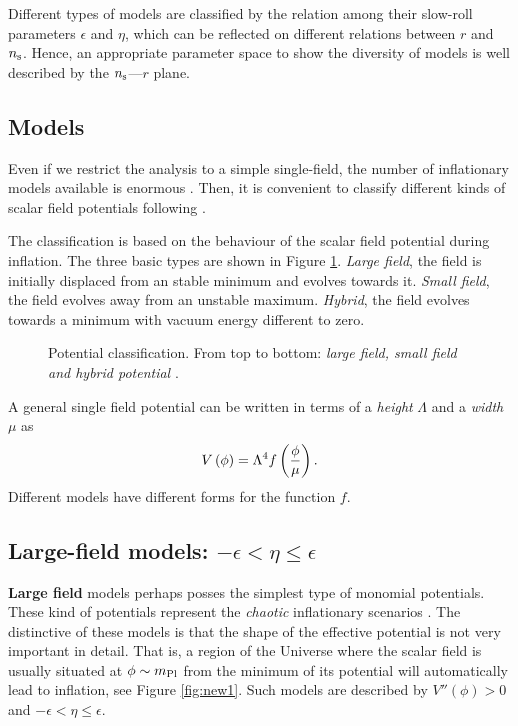 \documentclass{rmaa}
\begin{document}
Different types of models are classified by the relation among their slow-roll 
parameters $\epsilon$ and $\eta$, which can be reflected on different relations
 between $r$ and $n_{\rm s}$. Hence, an appropriate parameter space to show the diversity of models 
 is well described by the $n_{\rm s}$---$r$ plane.  



\subsection{Models}


Even if we restrict the analysis to a simple single-field, the number of inflationary models
available is enormous \citep{LiddleLyth, Lyth, Linde05}. Then, it is convenient to classify
different kinds of scalar field potentials following \citep{Kinney2}. 
%

The classification is based on the behaviour of the scalar field potential during inflation.
The three basic types are shown in Figure \ref{fig:models}.
{\em Large field}, the field is initially displaced from an stable minimum and evolves 
towards it. {\em Small field}, the field evolves away from an unstable maximum. 
{\em Hybrid}, the field evolves towards a minimum with vacuum energy different to zero. 


\begin{figure}[ht] 
\centerline{ \epsfxsize=270pt  }
\caption{Potential classification. From top to bottom:
\textit{large field, small field and hybrid potential} \citep{Kinney2}.}
\label{fig:models}
\end{figure}
%
A general single field potential can be written in terms of a \textit{height} $\Lambda$ and a 
\textit{width} $\mu$ as
%
\begin{equation}
V\left(\phi\right) = \Lambda^4 f\left({\phi \over \mu}\right).
\end{equation}
%
Different models have different forms for the function $f$.

\subsection{Large-field models: $-\epsilon < \eta \leq \epsilon$}


\textbf{Large field} models perhaps posses the simplest type of monomial potentials.
These kind of potentials represent the \textit{chaotic} inflationary
scenarios \citep{Linde2}. The distinctive of these models is that the  
shape of the effective potential is not very important in detail. That is, a region
of the Universe where the scalar field is usually situated at $ \phi \sim m_{\rm Pl}$ 
from the minimum of its potential will automatically lead to inflation, see Figure \ref{fig:new1}. Such
models are described by $V''\left(\phi\right) > 0$ and $-\epsilon < \eta
\leq \epsilon$. 
\\
\end{document}
